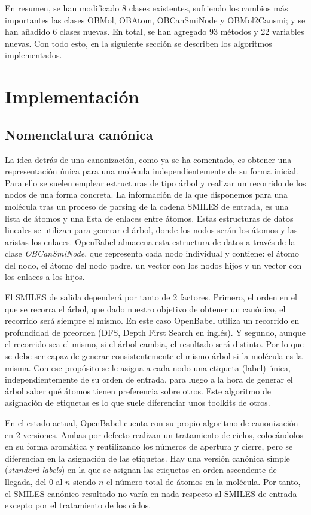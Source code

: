 En resumen, se han modificado 8 clases existentes, sufriendo los cambios más importantes las clases OBMol, OBAtom, OBCanSmiNode y OBMol2Cansmi; y se han añadido 6 clases nuevas. En total, se han agregado 93 métodos y 22 variables nuevas. Con todo esto, en la siguiente sección se describen los algoritmos implementados.

\section{Implementación}

\subsection{Nomenclatura canónica} \label{canonizacion} \label{implementacion:canonizado}

La idea detrás de una canonización, como ya se ha comentado, es obtener una representación única para una molécula independientemente de su forma inicial. Para ello se suelen emplear estructuras de tipo árbol y realizar un recorrido de los nodos de una forma concreta. La información de la que disponemos para una molécula tras un proceso de parsing de la cadena SMILES de entrada, es una lista de átomos y una lista de enlaces entre átomos. Estas estructuras de datos lineales se utilizan para generar el árbol, donde los nodos serán los átomos y las aristas los enlaces. OpenBabel almacena esta estructura de datos a través de la clase \textit{OBCanSmiNode}, que representa cada nodo individual y contiene: el átomo del nodo, el átomo del nodo padre, un vector con los nodos hijos y un vector con los enlaces a los hijos.

El SMILES de salida dependerá por tanto de 2 factores. Primero, el orden en el que se recorra el árbol, que dado nuestro objetivo de obtener un canónico, el recorrido será siempre el mismo. En este caso OpenBabel utiliza un recorrido en profundidad de preorden (DFS, Depth First Search en inglés). Y segundo, aunque el recorrido sea el mismo, si el árbol cambia, el resultado será distinto. Por lo que se debe ser capaz de generar consistentemente el mismo árbol si la molécula es la misma. Con ese propósito se le asigna a cada nodo una etiqueta (label) única, independientemente de su orden de entrada, para luego a la hora de generar el árbol saber qué átomos tienen preferencia sobre otros. Este algoritmo de asignación de etiquetas es lo que suele diferenciar unos toolkits de otros.

En el estado actual, OpenBabel cuenta con su propio algoritmo de canonización en 2 versiones. Ambas por defecto realizan un tratamiento de ciclos, colocándolos en su forma aromática y reutilizando los números de apertura y cierre, pero se diferencian en la asignación de las etiquetas. Hay una versión canónica simple (\textit{standard labels}) en la que se asignan las etiquetas en orden ascendente de llegada, del 0 al $n$ siendo $n$ el número total de átomos en la molécula. Por tanto, el SMILES canónico resultado no varía en nada respecto al SMILES de entrada excepto por el tratamiento de los ciclos. 

